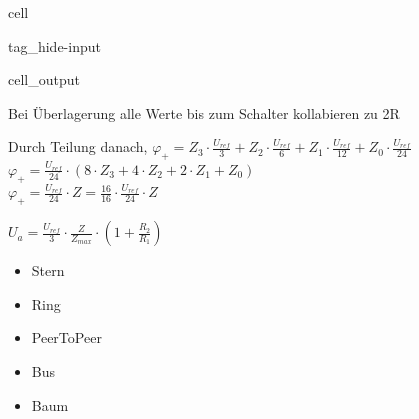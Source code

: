\documentclass[letterpaper,10pt,english]{jupyterBook}
\begin{document}
\begin{sphinxuseclass}{cell}
\begin{sphinxuseclass}{tag_hide-input}\begin{sphinxVerbatimOutput}

\begin{sphinxuseclass}{cell_output}
\noindent{}

\end{sphinxuseclass}\end{sphinxVerbatimOutput}

\end{sphinxuseclass}
\end{sphinxuseclass}
\sphinxAtStartPar
Bei Überlagerung alle Werte bis zum Schalter kollabieren zu 2R

\sphinxAtStartPar
Durch Teilung danach,
\(\varphi_+ = Z_3 \cdot \frac{U_{ref}}{3} + Z_2 \cdot \frac{U_{ref}}{6} + Z_1 \cdot \frac{U_{ref}}{12} + Z_0 \cdot \frac{U_{ref}}{24}\)\\
\(\varphi_+ = \frac{U_{ref}}{24} \cdot (8 \cdot Z_3 + 4 \cdot Z_2 +  2 \cdot Z_1 + Z_0)\)\\
\(\varphi_+ = \frac{U_{ref}}{24}\cdot Z = \frac{16}{16}\cdot \frac{U_{ref}}{24}\cdot Z\)

\sphinxAtStartPar
\(U_a = \frac{U_{ref}}{3}\cdot \frac{Z}{Z_{max}} \cdot \left(1 + \frac{R_2}{R_1} \right)\)

\begin{DUlineblock}{0em}
\item[] 
\end{DUlineblock}

\begin{DUlineblock}{0em}
\item[] 
\end{DUlineblock}

\begin{DUlineblock}{0em}
\item[] 
\end{DUlineblock}
\begin{itemize}
\item {} 
\sphinxAtStartPar
Stern

\item {} 
\sphinxAtStartPar
Ring

\item {} 
\sphinxAtStartPar
Peer\sphinxhyphen{}To\sphinxhyphen{}Peer

\item {} 
\sphinxAtStartPar
Bus

\item {} 
\sphinxAtStartPar
Baum

\end{itemize}
\end{document}
